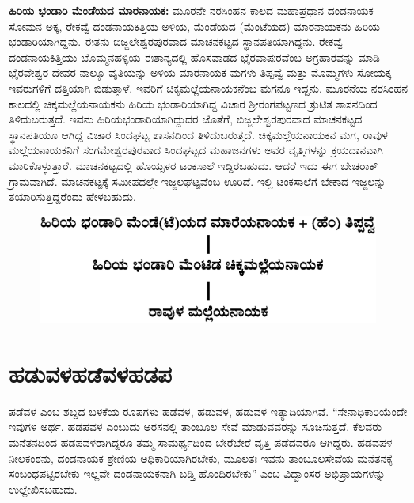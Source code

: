 \textbf{ಹಿರಿಯ ಭಂಡಾರಿ ಮೆಂಡೆಯದ ಮಾರನಾಯಕ:} ಮೂರನೇ ನರಸಿಂಹನ ಕಾಲದ ಮಹಾಪ್ರಧಾನ ದಂಡನಾಯಕ ಸೋಮನ ಅಕ್ಕ, ರೇಕವ್ವೆ ದಂಡನಾಯಕಿತ್ತಿಯ ಅಳಿಯ, ಮೆಂಡೆಯದ (ಮೆಂಟೆಯದ) ಮಾರನಾಯಕನು ಹಿರಿಯ ಭಂಡಾರಿ\-ಯಾಗಿದ್ದನು. ಈತನು ಬಿಜ್ಜಲೇಶ್ವರಪುರವಾದ ಮಾಚನಕಟ್ಟದ ಸ್ಥಾನಪತಿಯಾಗಿದ್ದನು. ರೇಕವ್ವೆ ದಂಡನಾಯಕಿತ್ತಿಯು ಬೊಮ್ಮನಹಳ್ಳಿಯ ಈಶಾನ್ಯದಲ್ಲಿ ಹೊಸವಾಡದ ಭೈರವಾಪುರವೆಂಬ ಅಗ್ರಹಾರವನ್ನು ಮಾಡಿ ಭೈರವೇಶ್ವರ ದೇವರ ನಾಲ್ಕೂ ವೃತಿಯನ್ನು ಅಳಿಯ ಮಾರನಾಯಕ ಮಗಳು ತಿಪ್ಪವ್ವೆ ಮತ್ತು ಮೊಮ್ಮಗಳು ಸೋಯಕ್ಕ ಇವರುಗಳಿಗೆ ದತ್ತಿಯಾಗಿ ಬಿಡುತ್ತಾಳೆ. ಇವರಿಗೆ ಚಿಕ್ಕಮಲ್ಲೆಯನಾಯಕನೆಂಬ ಮಗನೂ ಇದ್ದನು. ಮೂರನೆಯ ನರಸಿಂಹನ ಕಾಲದಲ್ಲಿ ಚಿಕ್ಕಮಲ್ಲೆಯನಾಯಕನು ಹಿರಿಯ ಭಂಡಾರಿಯಾಗಿದ್ದ ವಿಚಾರ ಶ‍್ರೀರಂಗಪಟ್ಟಣದ ತ್ರುಟಿತ ಶಾಸನದಿಂದ ತಿಳಿದುಬರುತ್ತದೆ. ಇವನು ಹಿರಿಯಭಂಡಾರಿಯಾಗಿ\-ದ್ದುದರ ಜೊತೆಗೆ, ಬಿಜ್ಜಲೇಶ್ವರಪುರವಾದ ಮಾಚನಕಟ್ಟದ ಸ್ಥಾನಪತಿಯೂ ಆಗಿದ್ದ ವಿಚಾರ ಸಿಂದಘಟ್ಟ ಶಾಸನದಿಂದ ತಿಳಿದು\-ಬರುತ್ತದೆ. ಚಿಕ್ಕಮಲ್ಲೆಯನಾಯಕನ ಮಗ, ರಾವುಳ ಮಲ್ಲೆಯನಾಯಕನಿಗೆ ಸಂಗಮೇಶ್ವರಪುರವಾದ ಸಿಂದಘಟ್ಟದ ಮಹಾಜನಗಳು ಅವರ ವೃತ್ತಿಗಳನ್ನು ಕ್ರಯದಾನವಾಗಿ ಮಾರಿಕೊಳ್ಳುತ್ತಾರೆ. ಮಾಚನಕಟ್ಟದಲ್ಲಿ ಹೊಯ್ಸಳರ ಟಂಕಸಾಲೆ ಇದ್ದಿರಬಹುದು. ಆದರೆ ಇದು ಈಗ ಬೇಚರಾಕ್​ ಗ್ರಾಮವಾಗಿದೆ. ಮಾಚನಕಟ್ಟಕ್ಕೆ ಸಮೀಪದಲ್ಲೇ ಇಜ್ಜಲಘಟ್ಟವೆಂಬ ಊರಿದೆ. ಇಲ್ಲಿ ಟಂಕಸಾಲೆಗೆ ಬೇಕಾದ ಇಜ್ಜಲನ್ನು ತಯಾರಿಸುತ್ತಿದ್ದರೆಂದು ಹೇಳಬಹುದು.

\begin{figure}[H]
\includegraphics[scale=1.2]{images/chap3/chap3fig31.jpeg}
\end{figure}


\section*{ಹಡುವಳ\enginline{-}ಹಡೆವಳ\enginline{-}ಹಡಪ}

ಪಡೆವಳ ಎಂಬ ಶಬ್ದದ ಬಳಕೆಯ ರೂಪಗಳು ಹಡೆವಳ, ಹಡುವಳ, ಹಡುವಳ ಇತ್ಯಾದಿಯಾಗಿವೆ. “ಸೇನಾಧಿಕಾರಿಯೆಂದೇ ಇವುಗಳ ಅರ್ಥ. ಹಡಪವಳ ಎಂಬುದು ಅರಸನಲ್ಲಿ ತಾಂಬೂಲ ಸೇವೆ ಮಾಡುವವರನ್ನು ಸೂಚಿಸುತ್ತದೆ. ಕೆಲವರು ಮನೆತನದಿಂದ ಹಡಪವಳರಾಗಿದ್ದರೂ ತಮ್ಮ ಸಾಮರ್ಥ್ಯದಿಂದ ಬೇರೆಬೇರೆ ವೃತ್ತಿ ಪಡೆದವರೂ ಆಗಿದ್ದರು. ಹಡವಪಳ ನೀಲಕಂಠನು, ದಂಡನಾಯಕ ಶ್ರೇಣಿಯ ಅಧಿಕಾರಿಯಾಗಿರಬೇಕು, ಮೂಲತಃ ಇವನು ತಾಂಬೂಲಸೇವೆಯ ಮನೆತನಕ್ಕೆ ಸಂಬಂಧಪಟ್ಟಿರಬೇಕು ಇಲ್ಲವೇ ದಂಡನಾಯಕನಾಗಿ ಬಡ್ತಿ ಹೊಂದಿರಬೇಕು” ಎಂಬ ವಿದ್ವಾಂಸರ ಅಭಿಪ್ರಾಯಗಳನ್ನು ಉಲ್ಲೇಖಿಸಬಹುದು.

